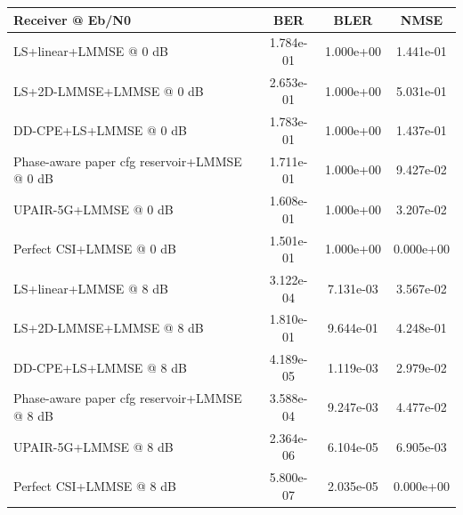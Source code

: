 \begin{tabular}{lccc}
\toprule
Receiver @ Eb/N0 & BER & BLER & NMSE \\
\midrule
LS+linear+LMMSE @ 0 dB & 1.784e-01 & 1.000e+00 & 1.441e-01 \\
LS+2D-LMMSE+LMMSE @ 0 dB & 2.653e-01 & 1.000e+00 & 5.031e-01 \\
DD-CPE+LS+LMMSE @ 0 dB & 1.783e-01 & 1.000e+00 & 1.437e-01 \\
Phase-aware paper cfg reservoir+LMMSE @ 0 dB & 1.711e-01 & 1.000e+00 & 9.427e-02 \\
UPAIR-5G+LMMSE @ 0 dB & 1.608e-01 & 1.000e+00 & 3.207e-02 \\
Perfect CSI+LMMSE @ 0 dB & 1.501e-01 & 1.000e+00 & 0.000e+00 \\
\midrule
LS+linear+LMMSE @ 8 dB & 3.122e-04 & 7.131e-03 & 3.567e-02 \\
LS+2D-LMMSE+LMMSE @ 8 dB & 1.810e-01 & 9.644e-01 & 4.248e-01 \\
DD-CPE+LS+LMMSE @ 8 dB & 4.189e-05 & 1.119e-03 & 2.979e-02 \\
Phase-aware paper cfg reservoir+LMMSE @ 8 dB & 3.588e-04 & 9.247e-03 & 4.477e-02 \\
UPAIR-5G+LMMSE @ 8 dB & 2.364e-06 & 6.104e-05 & 6.905e-03 \\
Perfect CSI+LMMSE @ 8 dB & 5.800e-07 & 2.035e-05 & 0.000e+00 \\
\bottomrule
\end{tabular}